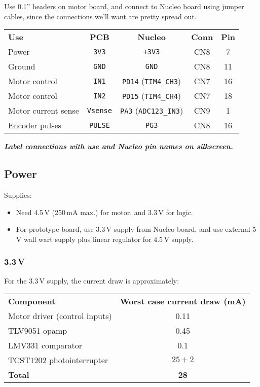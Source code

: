 \documentclass[a4paper,11pt,article]{memoir}
\newcommand{\todo}[1]{{\color{red}\textit{\textbf{#1}}}}
\begin{document}
Use 0.1'' headers on motor board, and connect to Nucleo board using
jumper cables, since the connections we'll want are pretty spread out.

\begin{center}
  \begin{tabular}{lcccc}
    \textbf{Use} & \textbf{PCB} & \textbf{Nucleo} & \textbf{Conn} & \textbf{Pin} \\
    Power  & \texttt{3V3} & \texttt{+3V3} & CN8 & 7\\
    Ground & \texttt{GND} & \texttt{GND} & CN8 & 11 \\
    Motor control & \texttt{IN1} & \texttt{PD14} (\texttt{TIM4\_CH3}) & CN7 & 16 \\
    Motor control & \texttt{IN2} & \texttt{PD15} (\texttt{TIM4\_CH4}) & CN7 & 18 \\
    Motor current sense & \texttt{Vsense} & \texttt{PA3} (\texttt{ADC123\_IN3}) & CN9 & 1 \\
    Encoder pulses & \texttt{PULSE} & \texttt{PG3} & CN8 & 16 \\
  \end{tabular}
\end{center}

\todo{Label connections with use and Nucleo pin names on silkscreen.}

\subsection*{Power}

Supplies:
\begin{itemize}
  \item{Need 4.5\,V (250\,mA max.) for motor, and 3.3\,V for logic.}
  \item{For prototype board, use 3.3\,V supply from Nucleo board, and
    use external 5\,V wall wart supply plus linear regulator for
    4.5\,V supply.}
\end{itemize}

\subsubsection{3.3\,V}

For the 3.3\,V supply, the current draw is approximately:

\begin{center}
  \begin{tabular}{lc}
    \textbf{Component} & \textbf{Worst case current draw (mA)} \\
    Motor driver (control inputs) & 0.11 \\
    TLV9051 opamp & 0.45 \\
    LMV331 comparator & 0.1 \\
    TCST1202 photointerrupter & $25 + 2$ \\
    \textbf{Total} & \textbf{28} \\
  \end{tabular}
\end{center}
\end{document}
